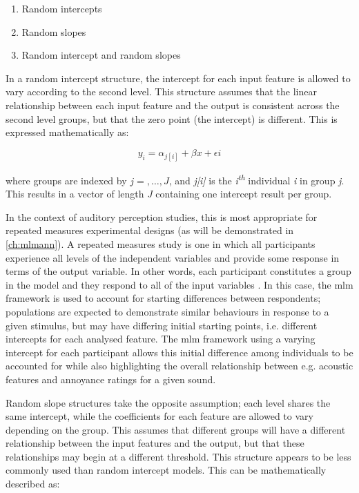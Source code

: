 \begin{enumerate}
  \item Random intercepts
  \item Random slopes
  \item Random intercept and random slopes
\end{enumerate}

In a random intercept structure, the intercept for each input feature is allowed to vary according to the second level. This structure assumes that the linear relationship between each input feature and the output is consistent across the second level groups, but that the zero point (the intercept) is different. This is expressed mathematically \citep{Gelman2006Multilevel} as:


\begin{equation}
  y_i = \alpha_{j[i]} + \beta x + \epsilon{i}
\end{equation}

where groups are indexed by $j = , \ldots, J$, and \emph{j[i]} is the \emph{i\textsuperscript{th}} individual \emph{i} in group \emph{j}. This results in a vector of length \emph{J} containing one intercept result per group.

In the context of auditory perception studies, this is most appropriate for repeated measures experimental designs (as will be demonstrated in \cref{ch:mlmann}). A repeated measures study is one in which all participants experience all levels of the independent variables and provide some response in terms of the output variable. In other words, each participant constitutes a group in the model and they respond to all of the input variables \citep{Kristjansson2007Multilevel}. In this case, the \gls{mlm} framework is used to account for starting differences between respondents; populations are expected to demonstrate similar behaviours in response to a given stimulus, but may have differing initial starting points, i.e. different intercepts for each analysed feature. The \gls{mlm} framework using a varying intercept for each participant allows this initial difference among individuals to be accounted for while also highlighting the overall relationship between e.g. acoustic features and annoyance ratings for a given sound. 

Random slope structures take the opposite assumption; each level shares the same intercept, while the coefficients for each feature are allowed to vary depending on the group. This assumes that different groups will have a different relationship between the input features and the output, but that these relationships may begin at a different threshold. This structure appears to be less commonly used than random intercept models. This can be mathematically described as:

